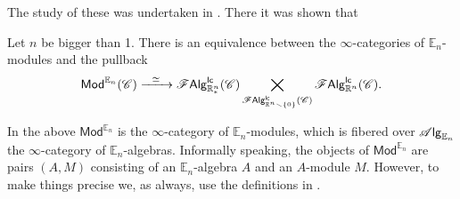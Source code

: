 \documentclass[../text]{subfiles}
\begin{document}



The study of these was undertaken in \cite{ginot2015}. There it was shown that

\begin{theorem}\label{thm:ginot_classif_Rn*}
    Let $n$ be bigger than 1. There is an equivalence between the $\infty$-categories of $\mathbb{E}_n$-modules and the pullback
    \begin{equation}
        \mathsf{Mod}^{\mathbb{E}_n} (\mathscr{C}) \xrightarrow{\ \ \simeq \ \ } \mathscr{F} \mathsf{Alg}^{\mathsf{lc}}_{\mathbb{R}^n_*} (\mathscr{C}) \bigtimes_{\mathscr{F} \mathsf{Alg}^{\mathsf{lc}}_{\mathbb{R}^n \smallsetminus \{ 0\} } (\mathscr{C})} \mathscr{F} \mathsf{Alg}^{\mathsf{lc}}_{\mathbb{R}^n} (\mathscr{C}).
    \end{equation}
\end{theorem}

\begin{remark}
    In the above $\mathsf{Mod}^{\mathbb{E}_n}$ is the $\infty$-category of $\mathbb{E}_n$-modules, which is fibered over $\mathscr{A} \mathsf{lg}_{\mathbb{E}_n}$ the $\infty$-category of $\mathbb{E}_n$-algebras. Informally speaking, the objects of $\mathsf{Mod}^{\mathbb{E}_n}$ are pairs $(A, M)$ consisting of an $\mathbb{E}_n$-algebra $A$ and an $A$-module $M$. However, to make things precise we, as always, use the definitions in \cite[ch.3]{lurie_ha}.
\end{remark}
\end{document}
